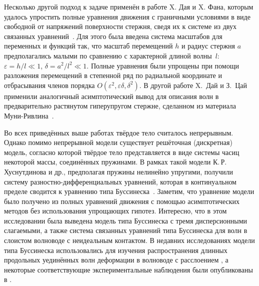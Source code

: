 \documentclass[12pt, a4paper]{report}
\begin{document}
Несколько другой подход к задаче применён в работе X. Дая и X. Фана, которым удалось упростить полные уравнения движения с граничными условиями в виде свободной от напряжений поверхности стержня, сведя их к системе из двух связанных уравнений~\cite{DF}. Для этого была введена система масштабов для переменных и функций так, что масштаб перемещений $h$ и радиус стержня $a$предполагались малыми по сравнению с характерной длиной волны~$l$: $\varepsilon = h/l \ll 1$, $\delta = a^2/l^2 \ll 1$.
Полные уравнения были упрощены при помощи разложения перемещений в степенной ряд по радиальной координате и отбрасывания членов порядка $O(\varepsilon^2, \varepsilon\delta, \delta^2)$.
В другой работе X.~Дай и З.~Цай применили аналогичный асимптотический вывод для описания волн в предварительно растянутом гиперупругом стержне, сделанном из материала Муни-Ривлина~\cite{DC}.

Во всех приведённых выше работах твёрдое тело считалось непрерывным. Однако помимо непрерывной модели существует решёточная (дискретная) модель, согласно которой твёрдое тело представляется в виде системы часиц некоторой массы, соединённых пружинами. В рамках такой модели К.\,Р. Хуснутдинова и др., предполагая пружины нелинейно упругими, получили систему разностно-дифференциальных уравнений, которая в континуальном пределе сводится к уравнению типа Буссинеска~\cite{KSZ}. Заметим, что уравнение модели было получено из полных уравнений движения с помощью асимптотических методов без использования упрощающих гипотез. Интересно, что в этом исследовании была выведена модель типа Буссинеска с тремя дисперсионными слагаемыми, а также система связанных уравнений типа Буссинеска для волн в слоистом волноводе с неидеальным контактом.
В недавних исследованиях модели типа Буссинеска использовались для изучения распространения длинных продольных уединённых волн деформации в волноводе с расслоением \cite{KS, KT1, KT2}, а некоторые соответствующие экспериментальные наблюдения были опубликованы в \cite{JAP2010, JAP2012}. 
\end{document}

